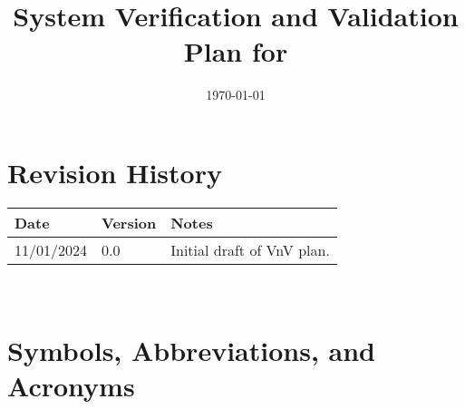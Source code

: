 \documentclass[12pt, titlepage]{article}
\begin{document}
\title{System Verification and Validation Plan for \progname{}} 
\author{\authname}
\date{\today}
	
\maketitle


\section*{Revision History}

\begin{tabularx}{\textwidth}{p{3cm}p{2cm}X}
\toprule {\bf Date} & {\bf Version} & {\bf Notes}\\
\midrule
11/01/2024 & 0.0 & Initial draft of VnV plan.\\
\bottomrule
\end{tabularx}

~\\


\newpage

\tableofcontents

\listoftables
{}

\listoffigures
{}

\newpage

\section{Symbols, Abbreviations, and Acronyms}
\end{document}
